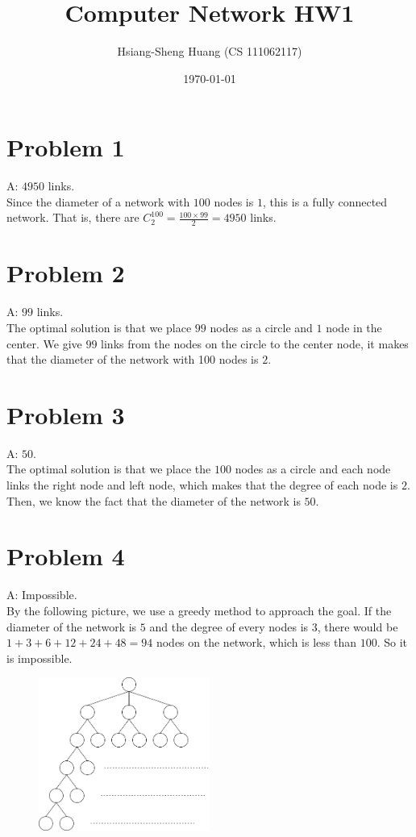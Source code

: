 \documentclass{article}
\title{Computer Network HW1}
\author{Hsiang-Sheng Huang (CS 111062117)}
\date{\today}
\begin{document}
\maketitle

\section{Problem 1}
A: $4950$ links.\\

Since the diameter of a network with $100$ nodes is $1$, this is a fully connected network. That is, there are $C^{100}_2=\frac{100\times99}{2}=4950$ links.

\section{Problem 2}
A: $99$ links.\\

The optimal solution is that we place $99$ nodes as a circle and $1$ node in the center. We give $99$ links from the nodes on the circle to the center node, it makes that the diameter of the network with 100 nodes is $2$.\\

\section{Problem 3}
A: $50$.\\

The optimal solution is that we place the $100$ nodes as a circle and each node links the right node and left node, which makes that the degree of each node is $2$. Then, we know the fact that the diameter of the network is $50$.

\newpage

\section{Problem 4}
A: Impossible.\\

By the following picture, we use a greedy method to approach the goal. If the diameter of the network is $5$ and the degree of every nodes is $3$, there would be $1+3+6+12+24+48=94$ nodes on the network, which is less than $100$. So it is impossible.

\begin{figure}[htbp]
  \centering
  \includegraphics[width=0.5\textwidth]{001.png}
\end{figure}
\end{document}

